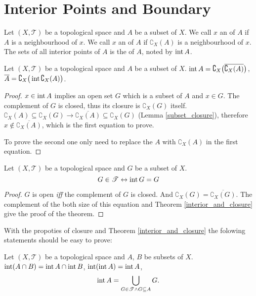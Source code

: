 \documentclass[openany]{book}
\begin{document}
\section{Interior Points and Boundary}
\begin{definition}
Let $(X,\mathscr T)$ be a topological space and $A$ be a subset of $X$.
We call $x$ an  of $A$ if $A$ is a neighbourhood of $x$.
We call $x$ an  of $A$ if $\complement_X(A)$ is a neighbourhood of $x$.
The sets of all interior points of $A$ is the  of $A$, noted by $\operatorname{int} A$.
\end{definition}

\begin{theorem}\label{interior_and_closure}
Let $(X,\mathscr T)$ be a topological space and $A$ be a subset of $X$. 
$\operatorname{int} A=\complement_X\big(
	\overline{
		\complement_X(A)}\big)$, 
$\overline A = \complement_X\big(
	\operatorname{int} \complement_X(A)\big)$.
\end{theorem}
\begin{proof}
$x\in \operatorname{int} A$ implies an open set $G$ which is a subset of $A$ and $x\in G$.
The complement of $G$ is closed, thus its closure is $\complement_X(G)$ itself. 
$\complement_X(A)\subseteq \complement_X(G) \rightarrow 
	\overline{\complement_X(A)}\subseteq \complement_X(G)$ (Lemma \ref{subset_closure}), 
therefore $x\notin \overline{\complement_X(A)}$, which is the first equation to prove.

To prove the second one only need to replace the $A$ with $\complement_X(A)$ in the first equation.
\end{proof}

\begin{theorem}
Let $(X,\mathscr T)$ be a topological space and $G$ be a subset of $X$. 
\[
	G\in \mathscr T \leftrightarrow
		\operatorname{int} G=G
\]
\end{theorem}
\begin{proof}
$G$ is open \emph{iff} the complement of $G$ is closed. And $\complement_X (G) = \overline{\complement_X (G)}$.
The complement of the both size of this equation and Theorem \ref{interior_and_closure} give the proof of the theorem.
\end{proof}

With the propoties of closure and Theorem \ref{interior_and_closure} the folowing statements should be easy to prove:
\begin{theorem}
Let $(X,\mathscr T)$ be a topological space and $A$, $B$ be subsets of $X$. 
$\operatorname{int} (A\cap B) = \operatorname{int} A \cap \operatorname{int} B$, $\operatorname{int}(\operatorname{int} A) =\operatorname{int} A$,
\[
	\operatorname{int} A = \bigcup\limits_{G\in\mathscr T \wedge G\subseteq A} G.
\]
\end{theorem}
\end{document}
